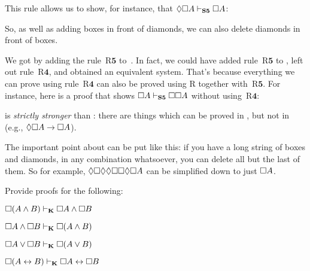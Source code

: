This rule allows us to show, for instance, that $\Diamond\Box A\vdash_{\mathbf{S5}}  \Box A$:
\begin{fitchproof}
	\PR
	\open
	\AS
	\open
	\AS
	\close
	\close
\end{fitchproof}

So, as well as adding boxes in front of diamonds, we can also delete diamonds in front of boxes.

We got \mlSfive{} by adding the rule~R$\mathbf{5}$ to~\mlSfour. In
fact, we could have added rule~R$\mathbf{5}$ to \mlT{}, left out
rule~R$\mathbf{4}$, and obtained an equivalent system. That's because
everything we can prove using rule~R$\mathbf{4}$ can also be proved
using R\mlT{} together with~R$\mathbf{5}$. For instance, here is a
proof that shows $\Box A \vdash_{\mathbf{S5}} \Box\Box A$ without
using~R$\mathbf{4}$:
\begin{fitchproof}
	\PR
	\open
	\AS
	\close
	\open
	\AS
	\open
	\AS
	\open
	\AS
	\close
	\close
	\close
\end{fitchproof}
\mlSfive{} is \emph{strictly stronger} than \mlSfour: there are things which can be proved in \mlSfive, but not in \mlSfour{} (e.g., $\Diamond\Box A \rightarrow \Box A$).

The important point about \mlSfive{} can be put like this: if you have a long string of boxes and diamonds, in any combination whatsoever, you can delete all but the last of them. So for example, $\Diamond\Box\Diamond\Diamond\Box\Box\Diamond\Box A$ can be simplified down to just $\Box A$.

\practiceproblems

\problempart
Provide proofs for the following:
\begin{compactlist}
	\item $\Box (A\wedge B)\vdash_{\mathbf{K}}\Box A \wedge \Box B$
	\item $\Box A\wedge\Box B\vdash_{\mathbf{K}}\Box( A \wedge  B)$
	\item $\Box A\vee\Box B\vdash_{\mathbf{K}}\Box( A \vee  B)$
	\item $\Box (A \leftrightarrow B)\vdash_{\mathbf{K}} \Box A \leftrightarrow \Box B$
\end{compactlist}

